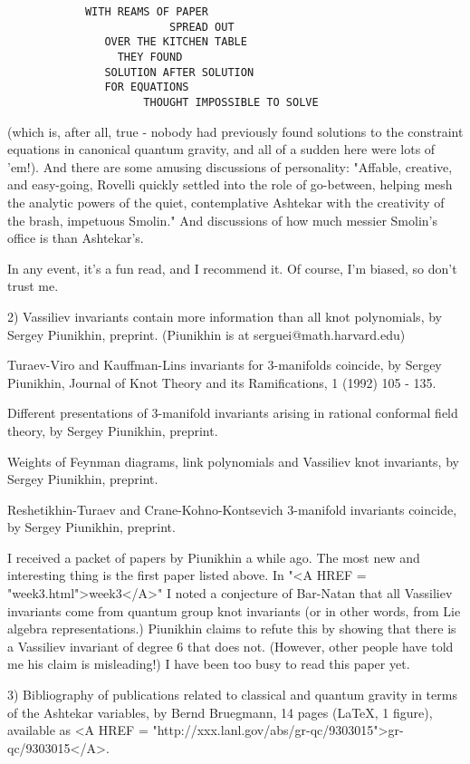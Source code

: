 \begin{verbatim}
			WITH REAMS OF PAPER
            		     SPREAD OUT
		       OVER THE KITCHEN TABLE
			     THEY FOUND
		       SOLUTION AFTER SOLUTION
			   FOR EQUATIONS
                     THOUGHT IMPOSSIBLE TO SOLVE
\end{verbatim}
    

(which is, after all, true - nobody had previously found solutions to
the constraint equations in canonical quantum gravity, and all of a
sudden here were lots of 'em!).  And there are some amusing discussions
of personality: "Affable, creative, and easy-going, Rovelli quickly
settled into the role of go-between, helping mesh the analytic powers of
the quiet, contemplative Ashtekar with the creativity of the brash,
impetuous Smolin."  And discussions of how much messier Smolin's office
is than Ashtekar's. 

In any event, it's a fun read, and I recommend it.  Of course, I'm
biased, so don't trust me.

2) Vassiliev invariants contain more information than all knot
polynomials, by Sergey Piunikhin, preprint.  (Piunikhin is at
serguei@math.harvard.edu) 

Turaev-Viro and Kauffman-Lins invariants for 3-manifolds coincide, by
Sergey Piunikhin, Journal of Knot Theory and its Ramifications, 1 (1992)
105 - 135.

Different presentations of 3-manifold invariants arising in rational
conformal field theory, by Sergey Piunikhin, preprint.

Weights of Feynman diagrams, link polynomials and Vassiliev knot
invariants, by Sergey Piunikhin, preprint.

Reshetikhin-Turaev and Crane-Kohno-Kontsevich 3-manifold invariants
coincide, by Sergey Piunikhin, preprint.

I received a packet of papers by Piunikhin a while ago.  The most new
and interesting thing is the first paper listed above.  In "<A HREF = "week3.html">week3</A>" I noted
a conjecture of Bar-Natan that all Vassiliev invariants come from
quantum group knot invariants (or in other words, from Lie algebra
representations.)  Piunikhin claims to refute this by showing that there
is a Vassiliev invariant of degree 6 that does not.  (However, other
people have told me his claim is misleading!)  I have been too busy to
read this paper yet.   

3)  Bibliography of publications related to classical and quantum
gravity in terms of the Ashtekar variables, by Bernd Bruegmann, 14 pages
(LaTeX, 1 figure), available as <A HREF = "http://xxx.lanl.gov/abs/gr-qc/9303015">gr-qc/9303015</A>.

